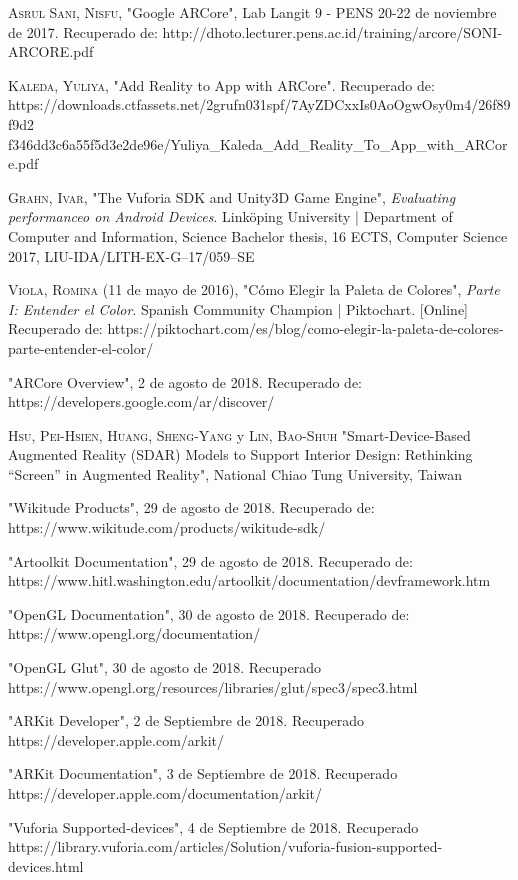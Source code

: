 \begin{thebibliography}{X}
	 \textsc{Asrul Sani, Nisfu}, "Google ARCore", Lab Langit 9 - PENS 20-22 de noviembre de 2017. Recuperado de: http://dhoto.lecturer.pens.ac.id/training/arcore/SONI-ARCORE.pdf
	
	 \textsc{Kaleda, Yuliya}, "Add Reality to App with ARCore". Recuperado de: https://downloads.ctfassets.net/2grufn031spf/7AyZDCxxIs0AoOgwOsy0m4/26f89f9d2
	f346dd3c6a55f5d3e2de96e/Yuliya\_Kaleda\_Add\_Reality\_To\_App\_with\_ARCore.pdf
	
	 \textsc{Grahn, Ivar}, "The Vuforia SDK and Unity3D Game Engine", \textit{Evaluating performanceo on Android Devices}. Linköping University | Department of Computer and Information, Science Bachelor thesis, 16 ECTS, Computer Science 2017, LIU-IDA/LITH-EX-G–17/059–SE
	
	 \textsc{Viola, Romina} (11 de mayo de 2016), "Cómo Elegir la Paleta de Colores", \textit{Parte I: Entender el Color}. Spanish Community Champion | Piktochart. [Online] Recuperado de: https://piktochart.com/es/blog/como-elegir-la-paleta-de-colores-parte-entender-el-color/
	
	 "ARCore Overview", 2 de agosto de 2018. Recuperado de: https://developers.google.com/ar/discover/
	
	 \textsc{Hsu, Pei-Hsien}, \textsc{Huang, Sheng-Yang} y \textsc{Lin, Bao-Shuh} "Smart-Device-Based Augmented Reality (SDAR) Models to Support Interior Design: Rethinking “Screen” in Augmented Reality", National Chiao Tung University, Taiwan
	
	 "Wikitude Products", 29 de agosto de 2018. Recuperado de: https://www.wikitude.com/products/wikitude-sdk/
	
	 "Artoolkit Documentation", 29 de agosto de 2018. Recuperado de:
	https://www.hitl.washington.edu/artoolkit/documentation/devframework.htm
	
	
	 "OpenGL Documentation", 30 de agosto de 2018. Recuperado de:
	https://www.opengl.org/documentation/
	
	 "OpenGL Glut", 30 de agosto de 2018. Recuperado
	https://www.opengl.org/resources/libraries/glut/spec3/spec3.html
	
	 "ARKit Developer", 2 de Septiembre de 2018. Recuperado
	https://developer.apple.com/arkit/
	
	 "ARKit Documentation", 3 de Septiembre de 2018. Recuperado
    https://developer.apple.com/documentation/arkit/
	
	 "Vuforia Supported-devices", 4 de Septiembre de 2018. Recuperado
	https://library.vuforia.com/articles/Solution/vuforia-fusion-supported-devices.html
\end{thebibliography}
